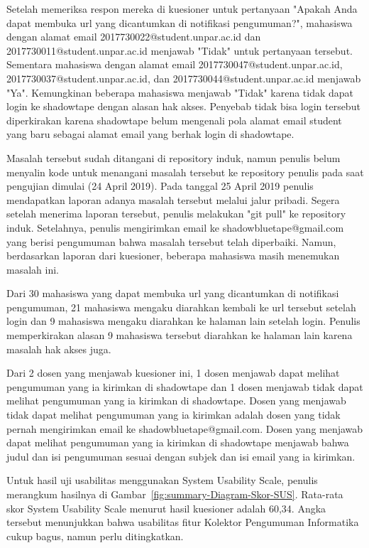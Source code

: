 Setelah memeriksa respon mereka di kuesioner untuk pertanyaan "Apakah Anda dapat membuka url yang dicantumkan di notifikasi pengumuman?", mahasiswa dengan alamat email 2017730022@student.unpar.ac.id dan 2017730011@student.unpar.ac.id menjawab "Tidak" untuk pertanyaan tersebut. Sementara mahasiswa dengan alamat email 2017730047@student.unpar.ac.id, 2017730037@student.unpar.ac.id, dan 2017730044@student.unpar.ac.id menjawab "Ya". Kemungkinan beberapa mahasiswa menjawab "Tidak" karena tidak dapat login ke shadowtape dengan alasan hak akses. Penyebab tidak bisa login tersebut diperkirakan karena shadowtape belum mengenali pola alamat email student yang baru sebagai alamat email yang berhak login di shadowtape. 

Masalah tersebut sudah ditangani di repository induk, namun penulis belum menyalin kode untuk menangani masalah tersebut ke repository penulis pada saat pengujian dimulai (24 April 2019). Pada tanggal 25 April 2019 penulis mendapatkan laporan adanya masalah tersebut melalui jalur pribadi. Segera setelah menerima laporan tersebut, penulis melakukan "git pull" ke repository induk. Setelahnya, penulis mengirimkan email ke shadowbluetape@gmail.com yang berisi pengumuman bahwa masalah tersebut telah diperbaiki. Namun, berdasarkan laporan dari kuesioner, beberapa mahasiswa masih menemukan masalah ini.

Dari 30 mahasiswa yang dapat membuka url yang dicantumkan di notifikasi pengumuman, 21 mahasiswa mengaku diarahkan kembali ke url tersebut setelah login dan 9 mahasiswa mengaku diarahkan ke halaman lain setelah login. Penulis memperkirakan alasan 9 mahasiswa tersebut diarahkan ke halaman lain karena masalah hak akses juga.

Dari 2 dosen yang menjawab kuesioner ini, 1 dosen menjawab dapat melihat pengumuman yang ia kirimkan di shadowtape dan 1 dosen menjawab tidak dapat melihat pengumuman yang ia kirimkan di shadowtape. Dosen yang menjawab tidak dapat melihat pengumuman yang ia kirimkan adalah dosen yang tidak pernah mengirimkan email ke shadowbluetape@gmail.com. Dosen yang menjawab dapat melihat pengumuman yang ia kirimkan di shadowtape menjawab bahwa judul dan isi pengumuman sesuai dengan subjek dan isi email yang ia kirimkan.

Untuk hasil uji usabilitas menggunakan System Usability Scale, penulis merangkum hasilnya di Gambar~\ref{fig:summary-Diagram-Skor-SUS}. Rata-rata skor System Usability Scale menurut hasil kuesioner adalah 60,34. Angka tersebut menunjukkan bahwa usabilitas fitur Kolektor Pengumuman Informatika cukup bagus, namun perlu ditingkatkan.

